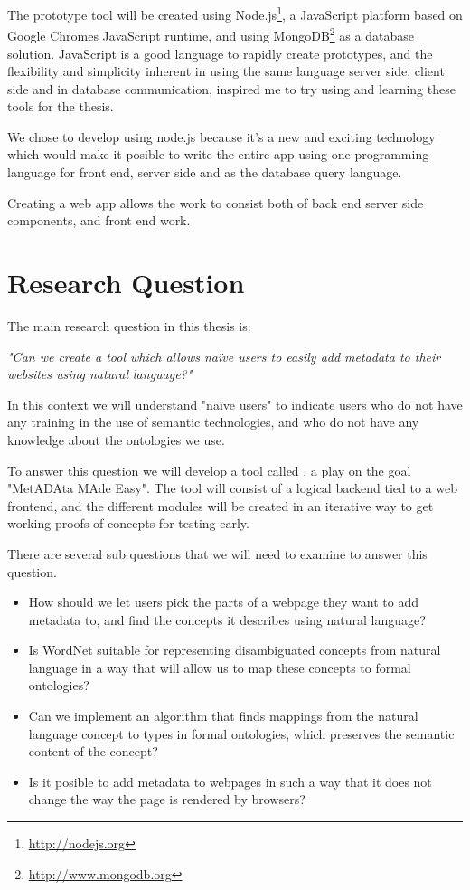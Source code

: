 The prototype tool will be created using Node.js\footnote{\url{http://nodejs.org}},
a JavaScript platform based on Google Chromes JavaScript runtime,
and using MongoDB\footnote{\url{http://www.mongodb.org}} as a database solution.
JavaScript is a good language to rapidly create prototypes, and the flexibility and simplicity inherent in using the same language
server side, client side and in database communication, inspired me to try using and learning these tools for the thesis.

%

We chose to develop using node.js because it's a new and exciting technology which would make it posible to write
the entire app using one programming language for front end, server side and as the database query language.

Creating a web app allows the work to consist both of back end server side components, and front end work.


\section{Research Question}
The main research question in this thesis is:

\emph{"Can we create a tool which allows naïve users to easily add metadata to their websites using natural language?"}

In this context we will understand "naïve users" to indicate users who do not have any training in the use of semantic technologies,
and who do not have any knowledge about the ontologies we use.

To answer this question we will develop a tool called \theartefact, a play on the goal "MetADAta MAde Easy".
The tool will consist of a logical backend tied to a web frontend,
and the different modules will be created in an iterative way to get working proofs of concepts for testing early.

There are several sub questions that we will need to examine to answer this question.
\begin{itemize}
	\item How should we let users pick the parts of a webpage they want to add metadata to,
and find the concepts it describes using natural language?
	\item Is WordNet suitable for representing disambiguated concepts from natural language in a way that will allow us to map these concepts to formal ontologies?
	\item Can we implement an algorithm that finds mappings from the natural language concept to types in
			formal ontologies, which preserves the semantic content of the concept?
	\item Is it posible to add metadata to webpages in such a way that it does not change the way the page is rendered by browsers?
\end{itemize}


